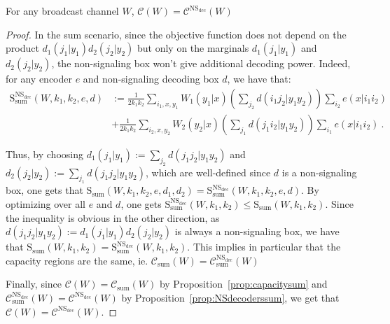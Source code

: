 \begin{theo}
    \label{theo:NSdecoders}
   For any broadcast channel $W$, $\mathcal{C}(W) = \mathcal{C}^{\mathrm{NS}_{\text{dec}}}(W)$
\end{theo}

\begin{proof}
In the sum scenario, since the objective function does not depend on the product $d_1(j_1|y_1)d_2(j_2|y_2)$ but only on the marginals $d_1(j_1|y_1)$ and $d_2(j_2|y_2)$, the non-signaling box won't give additional decoding power. Indeed, for any encoder $e$ and non-signaling decoding box $d$, we have that:
\begin{equation}
  \begin{aligned}
    \mathrm{S}_{\text{sum}}^{\mathrm{NS}_{\text{dec}}}(W,k_1,k_2,e,d) &:= \frac{1}{2k_1k_2}\sum_{i_1,x,y_1} W_1(y_1|x)\left(\sum_{j_2}d(i_1j_2|y_1y_2)\right)\sum_{i_2} e(x|i_1i_2)\\
    &+ \frac{1}{2k_1k_2} \sum_{i_2,x,y_2} W_2(y_2|x)\left(\sum_{j_1}d(j_1i_2|y_1y_2)\right)\sum_{i_1} e(x|i_1i_2) \ .
  \end{aligned}
\end{equation}

Thus, by choosing $d_1(j_1|y_1) := \sum_{j_2}d(j_1j_2|y_1y_2)$ and $d_2(j_2|y_2) := \sum_{j_1}d(j_1j_2|y_1y_2)$, which are well-defined since $d$ is a non-signaling box, one gets that $\mathrm{S}_{\text{sum}}(W,k_1,k_2,e,d_1,d_2) = \mathrm{S}_{\text{sum}}^{\mathrm{NS}_{\text{dec}}}(W,k_1,k_2,e,d)$. By optimizing over all $e$ and $d$, one gets $\mathrm{S}_{\text{sum}}^{\mathrm{NS}_{\text{dec}}}(W,k_1,k_2) \leq \mathrm{S}_{\text{sum}}(W,k_1,k_2)$. Since the inequality is obvious in the other direction, as $d(j_1j_2|y_1y_2) := d_1(j_1|y_1)d_2(j_2|y_2)$ is always a non-signaling box, we have that $\mathrm{S}_{\text{sum}}(W,k_1,k_2)=\mathrm{S}_{\text{sum}}^{\mathrm{NS}_{\text{dec}}}(W,k_1,k_2)$. This implies in particular that the capacity regions are the same, ie. $\mathcal{C}_{\text{sum}}(W)=\mathcal{C}_{\text{sum}}^{\mathrm{NS}_{\text{dec}}}(W)$

Finally, since $\mathcal{C}(W) = \mathcal{C}_{\text{sum}}(W)$ by Proposition~\ref{prop:capacitysum} and $\mathcal{C}_{\text{sum}}^{\mathrm{NS}_{\text{dec}}}(W)= \mathcal{C}^{\mathrm{NS}_{\text{dec}}}(W)$ by Proposition~\ref{prop:NSdecoderssum}, we get that $\mathcal{C}(W) = \mathcal{C}^{\mathrm{NS}_{\text{dec}}}(W)$.
\end{proof}

